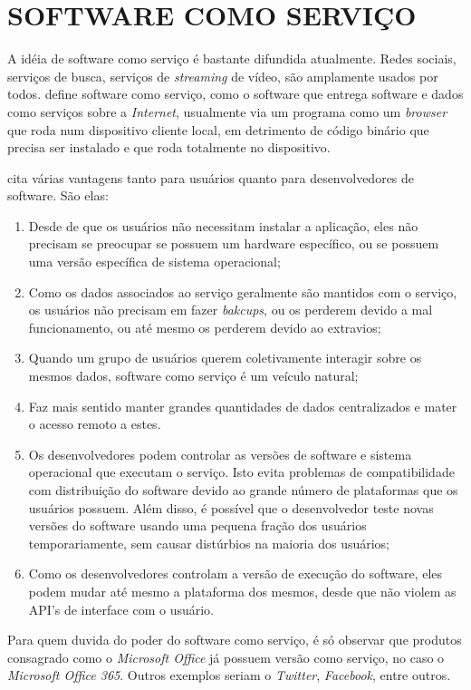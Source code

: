 \section{SOFTWARE COMO SERVIÇO} 

A idéia de software como serviço é bastante difundida atualmente. 
Redes sociais, serviços de busca, serviços de \emph{streaming} de vídeo, são amplamente usados por todos. 
\cite{Fox2012} define software como serviço, como o software que entrega software e dados como serviços sobre a \emph{Internet}, usualmente via um programa como um \emph{browser} que roda num dispositivo cliente local, em detrimento de código binário que precisa ser instalado e que roda totalmente no dispositivo.

\cite{Fox2012} cita várias vantagens tanto para usuários quanto para desenvolvedores de software. São elas:

\begin{enumerate}
	\item Desde de que os usuários não necessitam instalar a aplicação, eles não precisam se preocupar se possuem um hardware específico, ou se possuem uma versão específica de sistema operacional;
	\item Como os dados associados ao serviço geralmente são mantidos com o serviço, os usuários não precisam em fazer \emph{bakcups}, ou os perderem devido a mal funcionamento, ou até mesmo os perderem devido ao extravios;
	\item Quando um grupo de usuários querem coletivamente interagir sobre os mesmos dados, software como serviço é um veículo natural;
	\item Faz mais sentido manter grandes quantidades de dados centralizados e mater o acesso remoto a estes.
	\item Os desenvolvedores podem controlar as versões de software e sistema operacional que executam o serviço. Isto evita problemas de compatibilidade com distribuição do software devido ao grande número de plataformas que os usuários possuem. Além disso, é possível que o desenvolvedor teste novas versões do software usando uma pequena fração dos usuários temporariamente, sem causar distúrbios na maioria dos usuários;
	\item Como os desenvolvedores controlam a versão de execução do software, eles podem mudar até mesmo a plataforma dos mesmos, desde que não violem as API's de interface com o usuário.
\end{enumerate}

	Para quem duvida do poder do software como serviço, é só observar que produtos consagrado como o \emph{Microsoft Office} já possuem versão como serviço, no caso o \emph{Microsoft Office 365}. Outros exemplos seriam o \emph{Twitter}, \emph{Facebook}, entre outros.



